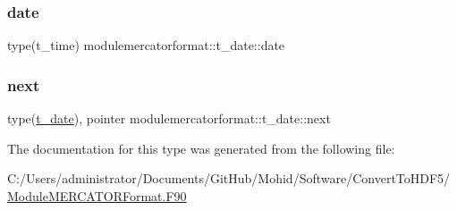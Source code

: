 \subsubsection{\texorpdfstring{date}{date}}
{\footnotesize\ttfamily type(t\+\_\+time) modulemercatorformat\+::t\+\_\+date\+::date\hspace{0.3cm}{\ttfamily [private]}}

\mbox{\label{structmodulemercatorformat_1_1t__date_a7d3fccdececebe11110578ccef68f957}} 
\subsubsection{\texorpdfstring{next}{next}}
{\footnotesize\ttfamily type(\mbox{\hyperlink{structmodulemercatorformat_1_1t__date}{t\+\_\+date}}), pointer modulemercatorformat\+::t\+\_\+date\+::next\hspace{0.3cm}{\ttfamily [private]}}



The documentation for this type was generated from the following file\+:\begin{DoxyCompactItemize}
\item 
C\+:/\+Users/administrator/\+Documents/\+Git\+Hub/\+Mohid/\+Software/\+Convert\+To\+H\+D\+F5/\mbox{\hyperlink{_module_m_e_r_c_a_t_o_r_format_8_f90}{Module\+M\+E\+R\+C\+A\+T\+O\+R\+Format.\+F90}}\end{DoxyCompactItemize}
